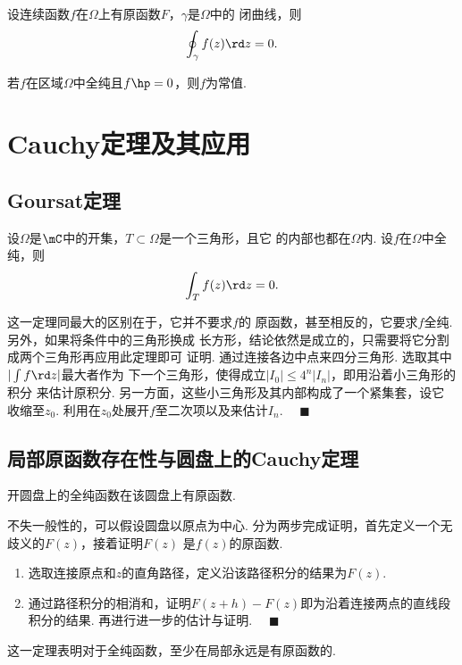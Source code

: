   \begin{cor}
    \label{cor: 曲线积分1}
    设连续函数$f$在$\Omega$上有原函数$F$，$\gamma$是$\Omega$中的
    闭曲线，则
    \[
      \oint_\gamma f(z)\rd z = 0.
    \]
  \end{cor}

  \begin{cor}
    若$f$在区域$\Omega$中全纯且$f\hp = 0$，则$f$为常值.
  \end{cor}

\newpage
\section{Cauchy定理及其应用}

\subsection{Goursat定理}

  \begin{thm}[Goursat]
    \label{thm: Goursat}
    设$\Omega$是$\mC$中的开集，$T\subset\Omega$是一个三角形，且它
    的内部也都在$\Omega$内. 设$f$在$\Omega$中全纯，则
    \[
      \int_T f(z)\rd z = 0.
    \]
  \end{thm}
  \remark
    这一定理同最大的区别在于，它并不要求$f$的
    原函数，甚至相反的，它要求$f$全纯. 另外，如果将条件中的三角形换成
    长方形，结论依然是成立的，只需要将它分割成两个三角形再应用此定理即可
    证明.
  \proof
    通过连接各边中点来四分三角形. 选取其中$|\int f\rd z|$最大者作为
    下一个三角形，使得成立$|I_0|\le 4^n|I_n|$，即用沿着小三角形的积分
    来估计原积分. 另一方面，这些小三角形及其内部构成了一个紧集套，设它
    收缩至$z_0$. 利用在$z_0$处展开$f$至二次项以及来估计$I_n$. $\quad\blacksquare$

\subsection{局部原函数存在性与圆盘上的Cauchy定理}

  \begin{thm}[局部存在性]
    \label{thm: 局部存在性}
    开圆盘上的全纯函数在该圆盘上有原函数.
  \end{thm}
  \proof
    不失一般性的，可以假设圆盘以原点为中心.
    分为两步完成证明，首先定义一个无歧义的$F(z)$，接着证明$F(z)$
    是$f(z)$的原函数.
    \begin{enumerate}
      \item 选取连接原点和$z$的直角路径，定义沿该路径积分的结果为$F(z)$.
      \item 通过路径积分的相消和，证明$F(z+h)-
        F(z)$即为沿着连接两点的直线段积分的结果. 再进行进一步的估计与证明.
        $\quad\blacksquare$
    \end{enumerate}
  \remark
    这一定理表明对于全纯函数，至少在局部永远是有原函数的.

